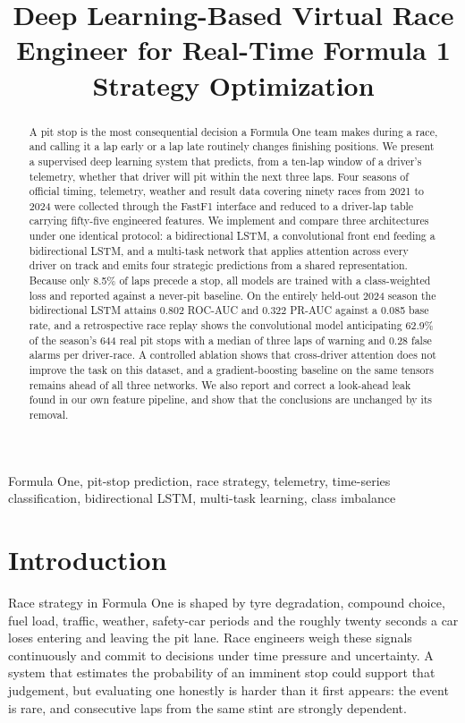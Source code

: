 \documentclass[conference]{IEEEtran}
\title{Deep Learning-Based Virtual Race Engineer for Real-Time Formula 1 Strategy Optimization}
\author{%
\IEEEauthorblockN{Dhruv Deepak, Akhil V, Mohan Simha Varma Dantuluri, and Surya Prathap Mamillapalli}
\IEEEauthorblockA{School of Computer Science and Engineering\\
Vellore Institute of Technology, Amaravati, India}
}
\begin{document}
\maketitle

\begin{abstract}
A pit stop is the most consequential decision a Formula One team makes during a race, and calling it a lap early or a lap late routinely changes finishing positions. We present a supervised deep learning system that predicts, from a ten-lap window of a driver's telemetry, whether that driver will pit within the next three laps. Four seasons of official timing, telemetry, weather and result data covering ninety races from 2021 to 2024 were collected through the FastF1 interface and reduced to a driver-lap table carrying fifty-five engineered features. We implement and compare three architectures under one identical protocol: a bidirectional LSTM, a convolutional front end feeding a bidirectional LSTM, and a multi-task network that applies attention across every driver on track and emits four strategic predictions from a shared representation. Because only 8.5\% of laps precede a stop, all models are trained with a class-weighted loss and reported against a never-pit baseline. On the entirely held-out 2024 season the bidirectional LSTM attains 0.802 ROC-AUC and 0.322 PR-AUC against a 0.085 base rate, and a retrospective race replay shows the convolutional model anticipating 62.9\% of the season's 644 real pit stops with a median of three laps of warning and 0.28 false alarms per driver-race. A controlled ablation shows that cross-driver attention does not improve the task on this dataset, and a gradient-boosting baseline on the same tensors remains ahead of all three networks. We also report and correct a look-ahead leak found in our own feature pipeline, and show that the conclusions are unchanged by its removal.
\end{abstract}

\begin{IEEEkeywords}
Formula One, pit-stop prediction, race strategy, telemetry, time-series classification, bidirectional LSTM, multi-task learning, class imbalance
\end{IEEEkeywords}

\section{Introduction}

Race strategy in Formula One is shaped by tyre degradation, compound choice, fuel load, traffic, weather, safety-car periods and the roughly twenty seconds a car loses entering and leaving the pit lane. Race engineers weigh these signals continuously and commit to decisions under time pressure and uncertainty. A system that estimates the probability of an imminent stop could support that judgement, but evaluating one honestly is harder than it first appears: the event is rare, and consecutive laps from the same stint are strongly dependent.
\end{document}
